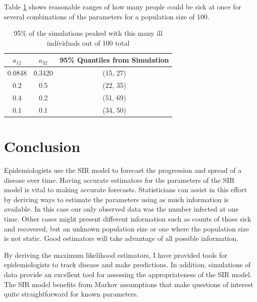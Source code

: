 \documentclass{svproc}
\begin{document}
Table \ref{tab3} shows reasonable ranges of how many people could be sick at once for several combinations of the parameters for a population size of 100. 
\begin{table}
\centering
\setlength{\tabcolsep}{5pt}
\begin{tabular}{|c|c|c|}

\hline
$a_{12}$ & $a_{32}$ & 95\% Quantiles from Simulation \\ \hline
0.0848 & 0.3420 & (15, 27) \\ \hline
0.2 & 0.5 & (22, 35) \\ \hline
0.4 & 0.2 & (51, 69) \\ \hline
0.1 & 0.1 & (34, 50) \\ \hline

\end{tabular}
\caption{95\% of the simulations peaked with this many ill individuals out of 100 total}
\label{tab3}
\end{table}

\section{Conclusion}
Epidemiologists use the SIR model to forecast the progression and spread of a disease over time. Having accurate estimators for the parameters of the SIR model is vital to making accurate forecasts. Statisticians can assist in this effort by deriving ways to estimate the parameters using as much information is available. In this case our only observed data was the number infected at one time. Other cases might present different information such as counts of those sick and recovered, but an unknown population size or one where the population size is not static. Good estimators will take advantage of all possible information. 

By deriving the maximum likelihood estimators, I have provided tools for epidemiologists to track disease and make predictions. In addition, simulations of data provide an excellent tool for assessing the appropriateness of the SIR model. The SIR model benefits from Markov assumptions that make questions of interest quite straightforward for known parameters. 
\end{document}
